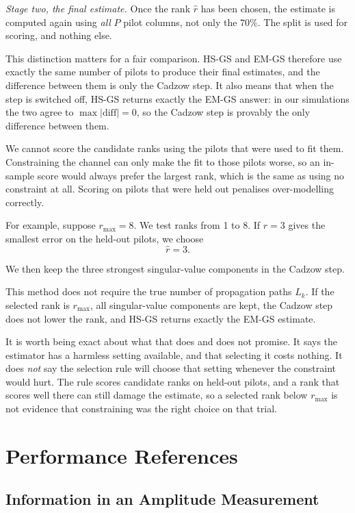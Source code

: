 \documentclass[journal]{IEEEtran}
\newcommand{\rmax}{r_{\mathrm{max}}}
\begin{document}
\emph{Stage two, the final estimate.} Once the rank $\hat r$ has been chosen,
the estimate is computed again using \emph{all} $P$ pilot columns, not only the
$70\%$. The split is used for scoring, and nothing else.

This distinction matters for a fair comparison. HS-GS and EM-GS therefore use
exactly the same number of pilots to produce their final estimates, and the
difference between them is only the Cadzow step. It also means that when the
step is switched off, HS-GS returns exactly the EM-GS answer: in our
simulations the two agree to $\max|\text{diff}|=0$, so the Cadzow step is
provably the only difference between them.

We cannot score the candidate ranks using the pilots that were used to fit
them. Constraining the channel can only make the fit to those pilots worse, so
an in-sample score would always prefer the largest rank, which is the same as
using no constraint at all. Scoring on pilots that were held out penalises
over-modelling correctly.

For example, suppose $\rmax=8$. We test ranks from 1 to 8. If $r=3$ gives the
smallest error on the held-out pilots, we choose
\begin{equation}
\hat r=3.
\end{equation}

We then keep the three strongest singular-value components in the Cadzow step.

This method does not require the true number of propagation paths $L_k$. If the
selected rank is $\rmax$, all singular-value components are kept, the Cadzow
step does not lower the rank, and HS-GS returns exactly the EM-GS estimate.

It is worth being exact about what that does and does not promise. It says the
estimator has a harmless setting available, and that selecting it costs
nothing. It does \emph{not} say the selection rule will choose that setting
whenever the constraint would hurt. The rule scores candidate ranks on held-out
pilots, and a rank that scores well there can still damage the estimate, so a
selected rank below $\rmax$ is not evidence that constraining was the right
choice on that trial.

\section{Performance References}

\subsection{Information in an Amplitude Measurement}
\end{document}
